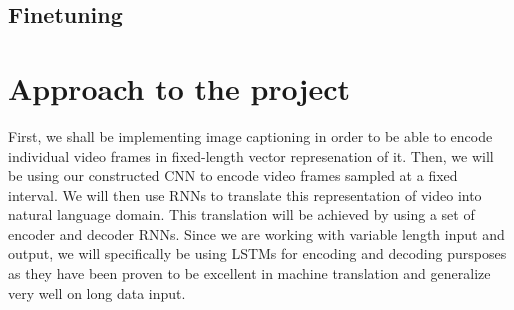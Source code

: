 \documentclass{article}
\begin{document}
			\subsection{Finetuning}
			





			


	\section{Approach to the project}
		First, we shall be implementing image captioning in order to be able to encode individual video frames in fixed-length vector represenation of it.
		Then, we will be using our constructed CNN to encode video frames sampled at a fixed interval.
		We will then use RNNs to translate this representation of video into natural language domain. This translation will be achieved by using a set of encoder and decoder RNNs. Since we are working with variable length input and output, we will specifically be using LSTMs for encoding and decoding pursposes as they have been proven to be excellent in machine translation and generalize very well on long data input.
\end{document}
